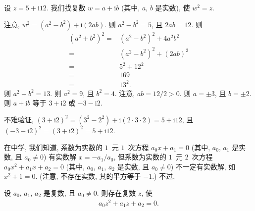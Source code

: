 \documentclass[../libro.tex]{subfiles}
\begin{document}
\begin{example}
    设 \(z = 5 + \mathrm{i} 12\).
    我们找复数 \(w = a + \mathrm{i} b\)
    (其中, \(a\), \(b\) 是实数),
    使 \(w^2 = z\).

    注意, \(w^2 = (a^2 - b^2) + \mathrm{i} (2 a b)\).
    则 \(a^2 - b^2 = 5\),
    且 \(2 a b = 12\).
    则
    \begin{align*}
        (a^2 + b^2)^2
        = {} &
        (a^2 - b^2)^2 + 4 a^2 b^2
        \\
        = {} &
        (a^2 - b^2)^2 + (2 a b)^2
        \\
        = {} &
        5^2 + 12^2
        \\
        = {} &
        169
        \\
        = {} &
        13^2.
    \end{align*}
    则 \(a^2 + b^2 = 13\).
    则 \(a^2 = 9\), 且 \(b^2 = 4\).
    注意, \(a b = 12/2 > 0\).
    则 \(a = \pm 3\), 且 \(b = \pm 2\).
    则 \(a + \mathrm{i} b\)
    等于 \(3 + \mathrm{i} 2\)
    或 \(-3 - \mathrm{i} 2\).

    不难验证,
    \((3 + \mathrm{i} 2)^2
        = (3^2 - 2^2) + \mathrm{i} (2 \cdot 3 \cdot 2)
    = 5 + \mathrm{i} 12\),
    且
    \((-3 - \mathrm{i} 2)^2
        = (3 + \mathrm{i} 2)^2
    = 5 + \mathrm{i} 12\).
\end{example}

在中学, 我们知道, 系数为实数的
\(1\)~元 \(1\)~次方程
\(a_0 x + a_1 = 0\)
(其中, \(a_0\), \(a_1\) 是实数,
且 \(a_0 \neq 0\))
有实数解 \(x = -a_1 / a_0\),
但系数为实数的 \(1\)~元 \(2\)~次方程
\(a_0 x^2 + a_1 x + a_2 = 0\)
(其中, \(a_0\), \(a_1\), \(a_2\) 是实数,
且 \(a_0 \neq 0\))
不一定有实数解,
如 \(x^2 + 1 = 0\).
(注意, 不存在实数, 其的平方等于 \(-1\).)
不过,

\begin{theorem}
    设 \(a_0\), \(a_1\), \(a_2\) 是复数,
    且 \(a_0 \neq 0\).
    则存在复数 \(z\), 使
    \begin{align*}
        a_0 z^2 + a_1 z + a_2 = 0.
    \end{align*}
\end{theorem}
\end{document}
